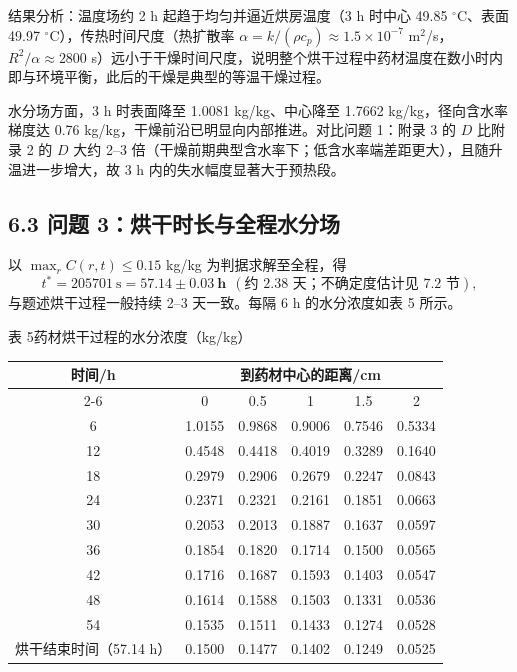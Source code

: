 \documentclass[12pt,a4paper]{ctexart}
\begin{document}
结果分析：温度场约 2 h 起趋于均匀并逼近烘房温度（3 h 时中心 49.85 $^\circ$C、表面 49.97 $^\circ$C），传热时间尺度（热扩散率 $\alpha=k/(\rho c_p)\approx1.5\times10^{-7}$ m$^2$/s，$R^2/\alpha\approx2800$ s）远小于干燥时间尺度，说明整个烘干过程中药材温度在数小时内即与环境平衡，此后的干燥是典型的等温干燥过程。

水分场方面，3 h 时表面降至 1.0081 kg/kg、中心降至 1.7662 kg/kg，径向含水率梯度达 0.76 kg/kg，干燥前沿已明显向内部推进。对比问题 1：附录 3 的 $D$ 比附录 2 的 $D$ 大约 2--3 倍（干燥前期典型含水率下；低含水率端差距更大），且随升温进一步增大，故 3 h 内的失水幅度显著大于预热段。

\subsection{6.3 问题 3：烘干时长与全程水分场}

以 $\max_r C(r,t)\le0.15$ kg/kg 为判据求解至全程，得
\begin{equation}
t^*=205701\ \mathrm{s}=\mathbf{57.14\pm0.03\ h}\ \ (\text{约 2.38 天；不确定度估计见 7.2 节}),
\end{equation}
与题述烘干过程一般持续 2--3 天一致。每隔 6 h 的水分浓度如表 5 所示。

\begin{center}
\begin{minipage}{\textwidth}
\centering
{\heiti{} 表 5\quad 药材烘干过程的水分浓度（kg/kg）}
\par\medskip
{\begin{tabular}{cccccc}
\toprule
时间/h & \multicolumn{5}{c}{到药材中心的距离/cm} \\
\cmidrule(lr){2-6}
 & 0 & 0.5 & 1 & 1.5 & 2 \\
\midrule
6     & 1.0155 & 0.9868 & 0.9006 & 0.7546 & 0.5334 \\
12    & 0.4548 & 0.4418 & 0.4019 & 0.3289 & 0.1640 \\
18    & 0.2979 & 0.2906 & 0.2679 & 0.2247 & 0.0843 \\
24    & 0.2371 & 0.2321 & 0.2161 & 0.1851 & 0.0663 \\
30    & 0.2053 & 0.2013 & 0.1887 & 0.1637 & 0.0597 \\
36    & 0.1854 & 0.1820 & 0.1714 & 0.1500 & 0.0565 \\
42    & 0.1716 & 0.1687 & 0.1593 & 0.1403 & 0.0547 \\
48    & 0.1614 & 0.1588 & 0.1503 & 0.1331 & 0.0536 \\
54    & 0.1535 & 0.1511 & 0.1433 & 0.1274 & 0.0528 \\
烘干结束时间（57.14 h） & 0.1500 & 0.1477 & 0.1402 & 0.1249 & 0.0525 \\
\bottomrule
\end{tabular}}
\end{minipage}
\end{center}
\end{document}
